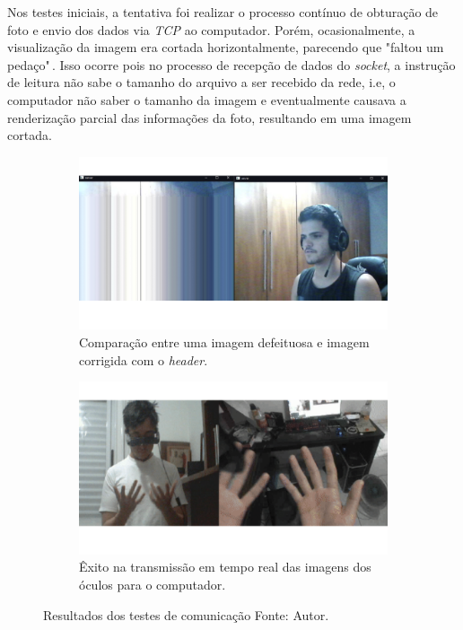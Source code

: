 
Nos testes iniciais, a tentativa foi realizar o processo contínuo de obturação de foto e envio dos dados via \textit{TCP} ao computador. Porém, ocasionalmente, a visualização da imagem era cortada horizontalmente, parecendo que "faltou um pedaço"\(\,\). Isso ocorre pois no processo de recepção de dados do \textit{socket}, a instrução de leitura não sabe o tamanho do arquivo a ser recebido da rede, i.e, o computador não saber o tamanho da imagem e eventualmente causava a renderização parcial das informações da foto, resultando em uma imagem cortada.

\begin{figure}[ht]
    \centering
        \begin{subfigure}{.45\textwidth}
            \centering
            \includegraphics[width=.95\linewidth]{figuras/header.png}
    \caption{Comparação entre uma imagem defeituosa e imagem corrigida com o \textit{header}.}
    \label{fig:header}
        \end{subfigure}
        \begin{subfigure}{.45\textwidth}
            \centering
            \includegraphics[width=.95\linewidth]{figuras/comm.png}
            \caption{Êxito na transmissão em tempo real das imagens dos óculos para o computador.}
            \label{fig:communication}
        \end{subfigure}
        \caption{Resultados dos testes de comunicação Fonte: Autor.}
        \label{fig:comm-tests}
    \end{figure}


